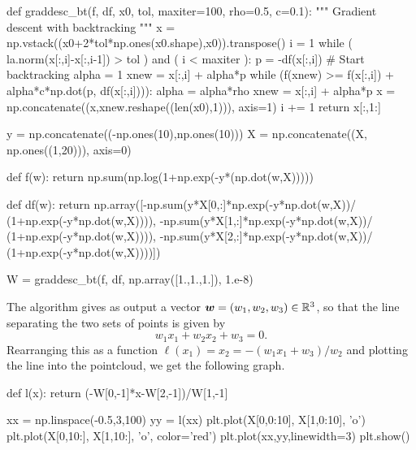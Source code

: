 \begin{example}
\begin{ipythonnb}
def graddesc_bt(f, df, x0, tol, maxiter=100, rho=0.5, c=0.1):
    """
    Gradient descent with backtracking
    """
    x = np.vstack((x0+2*tol*np.ones(x0.shape),x0)).transpose()
    i = 1
    while ( la.norm(x[:,i]-x[:,i-1]) > tol ) and ( i < maxiter ):
        p = -df(x[:,i])
        # Start backtracking
        alpha = 1
        xnew = x[:,i] + alpha*p
        while (f(xnew) >= f(x[:,i]) + alpha*c*np.dot(p, df(x[:,i]))):
            alpha = alpha*rho
            xnew = x[:,i] + alpha*p
        x = np.concatenate((x,xnew.reshape((len(x0),1))), axis=1)
        i += 1
    return x[:,1:]
\end{ipythonnb}

\begin{ipythonnb}
y = np.concatenate((-np.ones(10),np.ones(10)))
X = np.concatenate((X, np.ones((1,20))), axis=0)

def f(w):
    return np.sum(np.log(1+np.exp(-y*(np.dot(w,X)))))

def df(w):
    return np.array([-np.sum(y*X[0,:]*np.exp(-y*np.dot(w,X))/
     				 (1+np.exp(-y*np.dot(w,X)))), 
                     -np.sum(y*X[1,:]*np.exp(-y*np.dot(w,X))/
                     (1+np.exp(-y*np.dot(w,X)))),
                     -np.sum(y*X[2,:]*np.exp(-y*np.dot(w,X))/
                     (1+np.exp(-y*np.dot(w,X))))])

W = graddesc_bt(f, df, np.array([1.,1.,1.]), 1.e-8)                     
\end{ipythonnb}

The algorithm gives as output a vector $\bm{w}=(w_1,w_2,w_3)\in \mathbb{R}^3$, so that the line separating the two sets of points is given by
\begin{equation*}
 w_1 x_1 + w_2 x_2 + w_3 = 0.
\end{equation*}
Rearranging this as a function $\ell(x_1) = x_2 = -(w_1x_1+w_3)/w_2$ and plotting the line into the pointcloud, we get the following graph.

\begin{ipythonnb}
def l(x):
    return (-W[0,-1]*x-W[2,-1])/W[1,-1]
    
xx = np.linspace(-0.5,3,100)
yy = l(xx)
plt.plot(X[0,0:10], X[1,0:10], 'o')
plt.plot(X[0,10:], X[1,10:], 'o', color='red')
plt.plot(xx,yy,linewidth=3)
plt.show()
\end{ipythonnb}


\end{example}
